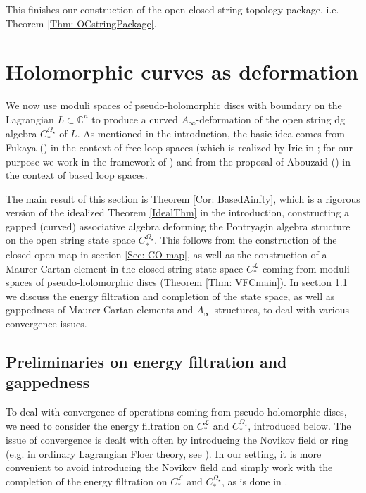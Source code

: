 \documentclass[10pt]{amsart}
\numberwithin{equation}{section}
\theoremstyle{plain}
\theoremstyle{definition}
\theoremstyle{remark}
\numberwithin{equation}{section}
\newcommand{\C}{\mathbb{C}}
\newcommand{\CFr}{C_*^\mathscr{L}}
\newcommand{\CBa}{C_*^{\Omega_\star}}
\begin{document}
{This finishes our construction of the open-closed string topology package, i.e. Theorem \ref{Thm: OCstringPackage}. 




\bigskip


\section{Holomorphic curves as deformation}
\label{Sec: HolomorphicCurves}

We now use moduli spaces of pseudo-holomorphic discs with boundary on the Lagrangian $L\subset \C^n$ to produce a curved $A_\infty$-deformation of the open string dg algebra $\CBa$ of $L$.
As mentioned in the introduction, the basic idea comes from Fukaya (\cite{FukayaLagrangian}) in the context of free loop spaces (which is realized by Irie in \cite{Irie1,Irie2}; for our purpose we work in the framework of \cite{WangThesis}) and from the proposal of Abouzaid (\cite{AbouzaidLect}) in the context of based loop spaces.

The main result of this section is Theorem \ref{Cor: BasedAinfty}, which is a rigorous version of the idealized Theorem \ref{IdealThm} in the introduction, constructing a gapped (curved) associative algebra deforming the Pontryagin algebra structure on the open string state space $\CBa$. 
This follows from the construction of the closed-open map in section \ref{Sec: CO map}, as well as the construction of a Maurer-Cartan element in the closed-string state space $\CFr$ coming from moduli spaces of pseudo-holomorphic discs (Theorem \ref{Thm: VFCmain}). In section \ref{Subsc: FiltrationGapped} we discuss the energy filtration and completion of the state space, as well as gappedness of Maurer-Cartan elements and $A_\infty$-structures,  to deal with various convergence issues.




\subsection{Preliminaries on energy filtration and gappedness}\label{Subsc: FiltrationGapped}

To deal with convergence of operations coming from pseudo-holomorphic discs, we need to consider the energy filtration on $\CFr$ and $\CBa$, introduced below. The issue of convergence is dealt with often by introducing the Novikov  field or ring (e.g. in ordinary Lagrangian Floer theory, see \cite{FOOO1,FOOO2}). In our setting, it is more convenient to avoid introducing the Novikov field and simply work with the completion of the energy filtration on $\CFr$ and $\CBa$, as is done in \cite{Irie2}.

}
\end{document}
